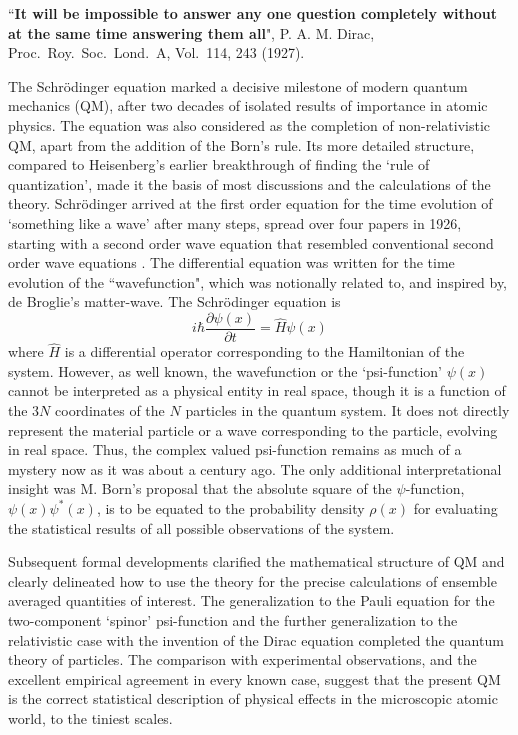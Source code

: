 ``\textbf{It will be impossible to answer any one question completely without at the
same time answering them all}", P. A. M. Dirac, Proc.\ Roy.\ Soc.\ Lond.\ A, Vol.\ 114,
243 (1927).

The Schr\"{o}dinger equation marked a decisive milestone of modern quantum mechanics
(QM), after two decades of isolated results of importance in atomic physics. The equation
was also considered as the completion of non-relativistic QM, apart from the addition of the
Born's rule. Its more detailed structure, compared to Heisenberg's earlier breakthrough of
finding the `rule of quantization', made it the basis of most discussions and the calculations
of the theory. Schr\"{o}dinger arrived at the first order equation for the time evolution of
`something like a wave' after many steps, spread over four papers in 1926, starting with a
second order wave equation that resembled conventional second order wave equations \cite{chap14-key1}.
The differential equation was written for the time evolution of the ``wavefunction", which was
notionally related to, and inspired by, de Broglie's matter-wave. The Schr\"{o}dinger equation
is
\begin{equation*}
i \hbar \frac{\partial \psi (x)}{\partial t} = \hat{H} \psi (x) \tag{1}\label{c14-eq1}
\end{equation*}
where $\hat{H}$ is a differential operator corresponding to the Hamiltonian of the system. However,
as well known, the wavefunction or the `psi-function' $\psi (x)$ cannot be interpreted as a physical
entity in real space, though it is a function of the $3N$ coordinates of the $N$ particles in the
quantum system. It does not directly represent the material particle or a wave corresponding
to the particle, evolving in real space. Thus, the complex valued psi-function remains as
much of a mystery now as it was about a century ago. The only additional interpretational
insight was M. Born's proposal that the absolute square of the $\psi$-function, $\psi(x) \psi^{\ast}(x)$, is to
be equated to the probability density $\rho(x)$ for evaluating the statistical results of all possible
observations of the system.

Subsequent formal developments clarified the mathematical structure of QM and clearly
delineated how to use the theory for the precise calculations of ensemble averaged quantities
of interest. The generalization to the Pauli equation for the two-component `spinor' psi-function and the further generalization to the relativistic case with the invention of the Dirac
equation completed the quantum theory of particles. The comparison with experimental
observations, and the excellent empirical agreement in every known case, suggest that the
present QM is the correct statistical description of physical effects in the microscopic atomic
world, to the tiniest scales.

